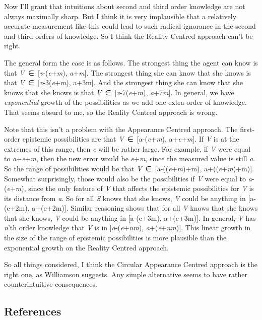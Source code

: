 \documentclass[
  11pt,
  letterpaper,
  DIV=11,
  numbers=noendperiod,
  twoside]{scrartcl}
\begin{document}
Now I'll grant that intuitions about second and third order knowledge
are not always maximally sharp. But I think it is very implausible that
a relatively accurate measurement like this could lead to such radical
ignorance in the second and third orders of knowledge. So I think the
Reality Centred approach can't be right.

The general form the case is as follows. The strongest thing the agent
can know is that \emph{V}~∈~{[}\emph{v}-(\emph{e}+\emph{m}),
\emph{a}+\emph{m}{]}. The strongest thing she can know that she knows is
that \emph{V}~∈~{[}\emph{v}-3(\emph{e}+\emph{m}), a+3m{]}. And the
strongest thing she can know that she knows that she knows is that
\emph{V}~∈~{[}\emph{v}-7(\emph{e}+\emph{m}), \emph{a}+7\emph{m}{]}. In
general, we have \emph{exponential} growth of the possibilities as we
add one extra order of knowledge. That seems absurd to me, so the
Reality Centred approach is wrong.

Note that this isn't a problem with the Appearance Centred approach. The
first-order epistemic possibilities are that
\emph{V}~∈~{[}a-(\emph{e}+\emph{m}), a+\emph{e}+\emph{m}{]}. If \emph{V}
is at the extremes of this range, then \emph{e} will be rather large.
For example, if \emph{V} were equal to \emph{a}+\emph{e}+\emph{m}, then
the new error would be \emph{e}+\emph{m}, since the measured value is
still \emph{a}. So the range of possibilities would be that
\emph{V}~∈~{[}a-((\emph{e}+\emph{m})+m), a+((\emph{e}+\emph{m})+m){]}.
Somewhat surprisingly, those would also be the possibilities if \emph{V}
were equal to \emph{a}-(\emph{e}+\emph{m}), since the only feature of
\emph{V} that affects the epistemic possibilities for \emph{V} is its
distance from \emph{a}. So for all \emph{S} knows that she knows,
\emph{V} could be anything in {[}a-(e+2m), a+(e+2m){]}. Similar
reasoning shows that for all \emph{V} knows that she knows that she
knows, \emph{V} could be anything in {[}a-(e+3m), a+(e+3m){]}. In
general, \emph{V} has \emph{n}'th order knowledge that \emph{V} is in
{[}\emph{a}-(\emph{e}+\emph{nm}), \emph{a}+(\emph{e}+\emph{nm}){]}. This
linear growth in the size of the range of epistemic possibilities is
more plausible than the exponential growth on the Reality Centred
approach.

So all things considered, I think the Circular Appearance Centred
approach is the right one, as Williamson suggests. Any simple
alternative seems to have rather counterintuitive consequences.

\subsection*{References}\label{references}
\end{document}
